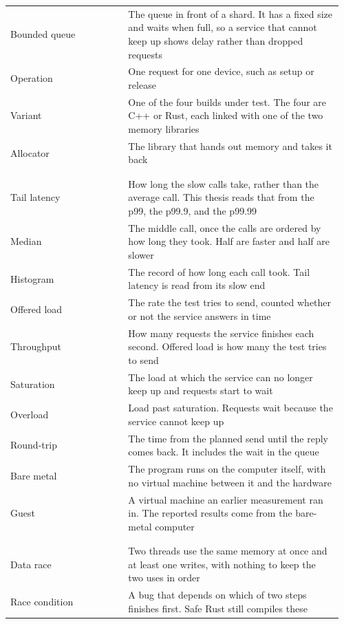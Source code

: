 \documentclass[english,oneside,a4paper,censored,csm,software-track-2020]{HYthesisML}
\begin{document}
\begin{longtable}{@{}>{\footnotesize\raggedright\arraybackslash}p{0.34\linewidth} >{\footnotesize\raggedright\arraybackslash}p{0.62\linewidth}@{}}
Bounded queue & The queue in front of a shard. It has a fixed size and waits when full, so a service that cannot keep up shows delay rather than dropped requests \\
Operation & One request for one device, such as setup or release \\
Variant & One of the four builds under test. The four are C++ or Rust, each linked with one of the two memory libraries \\
Allocator & The library that hands out memory and takes it back \\
\\[6pt]
\multicolumn{2}{@{}l}{\footnotesize\emph{Timing}}\\*[2pt]
Tail latency & How long the slow calls take, rather than the average call. This thesis reads that from the p99, the p99.9, and the p99.99 \\
Median & The middle call, once the calls are ordered by how long they took. Half are faster and half are slower \\
Histogram & The record of how long each call took. Tail latency is read from its slow end \\
Offered load & The rate the test tries to send, counted whether or not the service answers in time \\
Throughput & How many requests the service finishes each second. Offered load is how many the test tries to send \\
Saturation & The load at which the service can no longer keep up and requests start to wait \\
Overload & Load past saturation. Requests wait because the service cannot keep up \\
Round-trip & The time from the planned send until the reply comes back. It includes the wait in the queue \\
Bare metal & The program runs on the computer itself, with no virtual machine between it and the hardware \\
Guest & A virtual machine an earlier measurement ran in. The reported results come from the bare-metal computer \\
\\[6pt]
\multicolumn{2}{@{}l}{\footnotesize\emph{Safety}}\\*[2pt]
Data race & Two threads use the same memory at once and at least one writes, with nothing to keep the two uses in order \\
Race condition & A bug that depends on which of two steps finishes first. Safe Rust still compiles these \\

\end{longtable}
\end{document}
